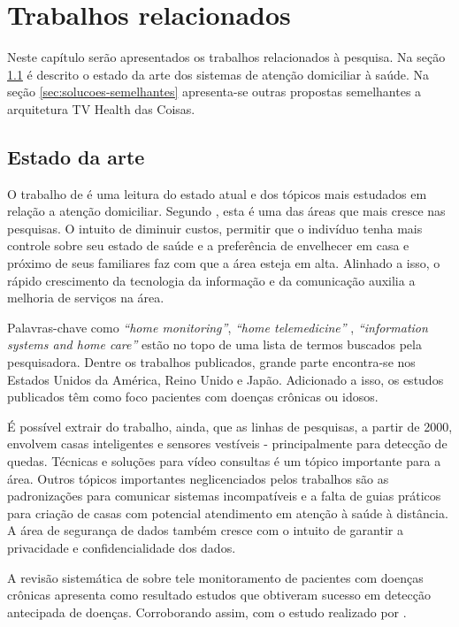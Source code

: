 \chapter{Trabalhos relacionados}\label{cap:trabalhos-relacionados}

Neste capítulo serão apresentados os trabalhos relacionados à pesquisa. Na
seção \ref{sec:estado-da-arte} é descrito o estado da arte dos sistemas 
de atenção domiciliar à saúde. Na seção \ref{sec:solucoes-semelhantes}
apresenta-se outras propostas semelhantes a arquitetura TV Health das Coisas.

\section{Estado da arte} \label{sec:estado-da-arte}

O trabalho de  é uma leitura do estado atual e dos
tópicos mais estudados em relação a atenção domiciliar. Segundo \citeauthor{koch2006home},
esta é uma das áreas que mais cresce nas pesquisas. O intuito de diminuir custos,
permitir que o indivíduo tenha mais controle sobre seu estado de saúde e a
preferência de envelhecer em casa e próximo de seus familiares faz com que a
área esteja em alta. Alinhado a isso, o rápido crescimento da tecnologia da
informação e da comunicação auxilia a melhoria de serviços na área.

Palavras-chave como \textit{``home monitoring''}, \textit{``home
telemedicine''} , \textit{``information systems and home care''} estão no topo
de uma lista de termos buscados pela pesquisadora. Dentre os trabalhos
publicados, grande parte encontra-se nos Estados Unidos da América, Reino Unido
e Japão. Adicionado a isso, os estudos publicados têm como foco pacientes com
doenças crônicas ou idosos.

É possível extrair do trabalho, ainda, que as linhas de pesquisas, a partir de
2000, envolvem casas inteligentes e sensores vestíveis - principalmente para
detecção de quedas. Técnicas e soluções para vídeo consultas é um tópico
importante para a área. Outros tópicos importantes neglicenciados pelos
trabalhos são as padronizações para comunicar sistemas incompatíveis e a falta
de guias práticos para criação de casas com potencial atendimento em atenção à
saúde à distância. A área de segurança de dados também cresce com o intuito de
garantir a privacidade e confidencialidade dos dados.

A revisão sistemática de  sobre tele
monitoramento de pacientes com doenças crônicas apresenta como resultado
estudos que obtiveram sucesso em detecção antecipada de doenças. 
Corroborando assim, com o estudo realizado por
.

